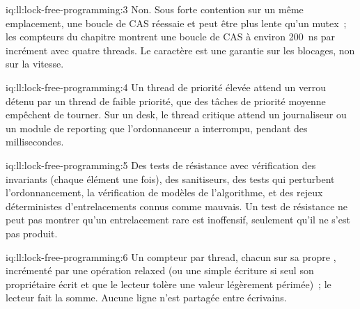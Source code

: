 \begin{solution}{iq:ll:lock-free-programming:3}
Non. Sous forte contention sur un même emplacement, une boucle de CAS réessaie et peut être plus lente qu'un mutex~; les compteurs du chapitre montrent une boucle de CAS
à environ \qty{200}{\nano\second} par incrément avec quatre threads. Le caractère  est une garantie sur les blocages, non sur la vitesse.
\end{solution}

\begin{solution}{iq:ll:lock-free-programming:4}
Un thread de priorité élevée attend un verrou détenu par un thread de faible priorité, que des tâches de priorité moyenne empêchent de tourner. Sur un desk, le
thread critique attend un journaliseur ou un module de reporting que l'ordonnanceur a interrompu, pendant des millisecondes.
\end{solution}

\begin{solution}{iq:ll:lock-free-programming:5}
Des tests de résistance avec vérification des invariants (chaque élément une fois), des sanitiseurs, des tests qui perturbent l'ordonnancement, la vérification de modèles
de l'algorithme, et des rejeux déterministes d'entrelacements connus comme mauvais. Un test de résistance ne peut pas montrer qu'un entrelacement rare est
inoffensif, seulement qu'il ne s'est pas produit.
\end{solution}

\begin{solution}{iq:ll:lock-free-programming:6}
Un compteur par thread, chacun sur sa propre , incrémenté par une opération relaxed (ou une simple écriture si seul son propriétaire écrit
et que le lecteur tolère une valeur légèrement périmée)~; le lecteur fait la somme. Aucune ligne n'est partagée entre écrivains.
\end{solution}
